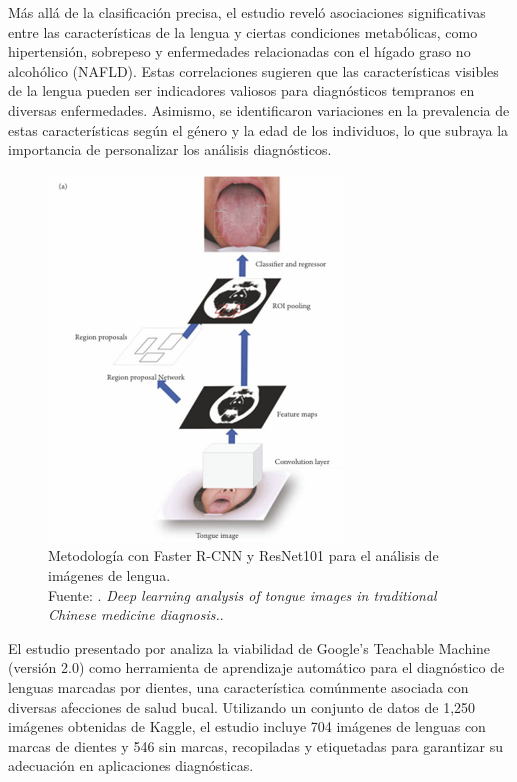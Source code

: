 Más allá de la clasificación precisa, el estudio reveló asociaciones significativas entre las características de la lengua y ciertas condiciones metabólicas, como hipertensión, sobrepeso y enfermedades relacionadas con el hígado graso no alcohólico (NAFLD). Estas correlaciones sugieren que las características visibles de la lengua pueden ser indicadores valiosos para diagnósticos tempranos en diversas enfermedades. Asimismo, se identificaron variaciones en la prevalencia de estas características según el género y la edad de los individuos, lo que subraya la importancia de personalizar los análisis diagnósticos.  

\begin{figure}[H]
	\begin{center}
		\includegraphics[width=0.7\textwidth]{2/figures/5.jpeg}
		\caption[Metodología con Faster R-CNN y ResNet101]{Metodología con Faster R-CNN y ResNet101 para el análisis de imágenes de lengua. \\
		Fuente: \cite{Jiang2022}. \textit{Deep learning analysis of tongue images in traditional Chinese medicine diagnosis.}.}
		\label{2:fig127}
	\end{center}
\end{figure}

El estudio presentado por \cite{Feasibility2020} analiza la viabilidad de Google’s Teachable Machine (versión 2.0) como herramienta de aprendizaje automático para el diagnóstico de lenguas marcadas por dientes, una característica comúnmente asociada con diversas afecciones de salud bucal. Utilizando un conjunto de datos de 1,250 imágenes obtenidas de Kaggle, el estudio incluye 704 imágenes de lenguas con marcas de dientes y 546 sin marcas, recopiladas y etiquetadas para garantizar su adecuación en aplicaciones diagnósticas.

